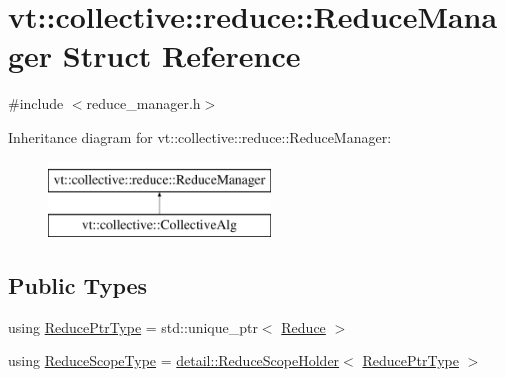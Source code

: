 \hypertarget{structvt_1_1collective_1_1reduce_1_1_reduce_manager}{}\section{vt\+:\+:collective\+:\+:reduce\+:\+:Reduce\+Manager Struct Reference}
\label{structvt_1_1collective_1_1reduce_1_1_reduce_manager}


{\ttfamily \#include $<$reduce\+\_\+manager.\+h$>$}

Inheritance diagram for vt\+:\+:collective\+:\+:reduce\+:\+:Reduce\+Manager\+:\begin{figure}[H]
\begin{center}
\leavevmode
\includegraphics[height=2.000000cm]{structvt_1_1collective_1_1reduce_1_1_reduce_manager}
\end{center}
\end{figure}
\subsection*{Public Types}
\begin{DoxyCompactItemize}
\item 
using \hyperlink{structvt_1_1collective_1_1reduce_1_1_reduce_manager_ae6d6635476f9d9f601d131a334ca3817}{Reduce\+Ptr\+Type} = std\+::unique\+\_\+ptr$<$ \hyperlink{structvt_1_1collective_1_1reduce_1_1_reduce}{Reduce} $>$
\item 
using \hyperlink{structvt_1_1collective_1_1reduce_1_1_reduce_manager_a2c340e5d3b12e4f2df64b9c1502445cf}{Reduce\+Scope\+Type} = \hyperlink{structvt_1_1collective_1_1reduce_1_1detail_1_1_reduce_scope_holder}{detail\+::\+Reduce\+Scope\+Holder}$<$ \hyperlink{structvt_1_1collective_1_1reduce_1_1_reduce_manager_ae6d6635476f9d9f601d131a334ca3817}{Reduce\+Ptr\+Type} $>$
\end{DoxyCompactItemize}
